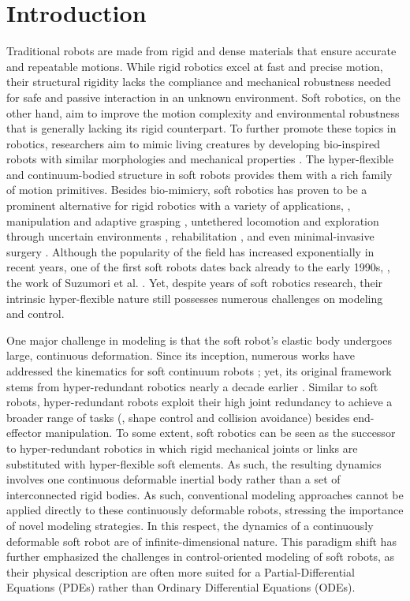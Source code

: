 \section{Introduction}
\label{sec: chap1 1_introduction}
Traditional robots are made from rigid and dense materials that ensure accurate and repeatable motions. While rigid robotics excel at fast and precise motion, their structural rigidity lacks the compliance and mechanical robustness needed for safe and passive interaction in an unknown environment. Soft robotics, on the other hand, aim to improve the motion complexity and environmental robustness that is generally lacking its rigid counterpart. To further promote these topics in robotics, researchers aim to mimic living creatures by developing bio-inspired robots with similar morphologies and mechanical properties \cite{Falkenhahn2015,Suzumori1991,Godage2015,Godage2016,Marchese2014,Kriegman2020}.
The hyper-flexible and continuum-bodied structure in soft robots provides them with a rich family of motion primitives. Besides bio-mimicry, soft robotics has proven to be a prominent alternative for rigid robotics with a variety of applications, \eg, manipulation and adaptive grasping \cite{Galloway2016}, untethered locomotion and exploration through uncertain environments \cite{Marchese2014,Choi2011,Pilz2020}, rehabilitation \cite{Polygerinos2015}, and even minimal-invasive surgery \cite{Li2017a,Cianchetti2014}. Although the popularity of the field has increased exponentially in recent years, one of the first soft robots dates back already to the early 1990s, \eg, the work of Suzumori et al. \cite{Suzumori1991}. Yet, despite years of soft robotics research, their intrinsic hyper-flexible nature still possesses numerous challenges on modeling and control.

One major challenge in modeling is that the soft robot's elastic body undergoes large, continuous deformation. Since its inception, numerous works have addressed the kinematics for soft continuum robots \cite{Jones2006,Mochiyama1999,Mochiyama2003}; yet, its original framework stems from hyper-redundant robotics nearly a decade earlier \cite{Chirikjian1994}. Similar to soft robots, hyper-redundant robots exploit their high joint redundancy to achieve a broader range of tasks (\eg, shape control and collision avoidance) besides end-effector manipulation. To some extent, soft robotics can be seen as the successor to hyper-redundant robotics in which rigid mechanical joints or links are substituted with hyper-flexible soft elements. As such, the resulting dynamics involves one continuous deformable inertial body rather than a set of interconnected rigid bodies. As such, conventional modeling approaches cannot be applied directly to these continuously deformable robots, stressing the importance of novel modeling strategies. In this respect, the dynamics of a continuously deformable soft robot are of infinite-dimensional nature. This paradigm shift has further emphasized the challenges in control-oriented modeling of soft robots, as their physical description are often more suited for a Partial-Differential Equations (PDEs) rather than Ordinary Differential Equations (ODEs).

